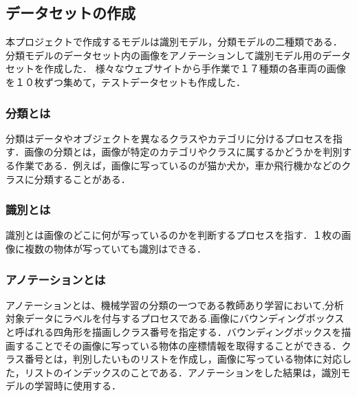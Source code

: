 \begin{multicols*}{2}
\subsection{データセットの作成}
本プロジェクトで作成するモデルは識別モデル，分類モデルの二種類である．%
分類モデルのデータセット内の画像をアノテーションして識別モデル用のデータセットを作成した．
様々なウェブサイトから手作業で１７種類の各車両の画像を１０枚ずつ集めて，テストデータセットも作成した．


\subsubsection{分類とは}
分類はデータやオブジェクトを異なるクラスやカテゴリに分けるプロセスを指す．画像の分類とは，画像が特定のカテゴリやクラスに属するかどうかを判別する作業である．例えば，画像に写っているのが猫か犬か，車か飛行機かなどのクラスに分類することがある．
\subsubsection{識別とは}
識別とは画像のどこに何が写っているのかを判断するプロセスを指す．１枚の画像に複数の物体が写っていても識別はできる．

\subsubsection{アノテーションとは}
アノテーションとは、機械学習の分類の一つである教師あり学習において,分析対象データにラベルを付与するプロセスである.画像にバウンディングボックスと呼ばれる四角形を描画しクラス番号を指定する．バウンディングボックスを描画することでその画像に写っている物体の座標情報を取得することができる．クラス番号とは，判別したいものリストを作成し，画像に写っている物体に対応した，リストのインデックスのことである．アノテーションをした結果は，識別モデルの学習時に使用する．


\end{multicols*}
